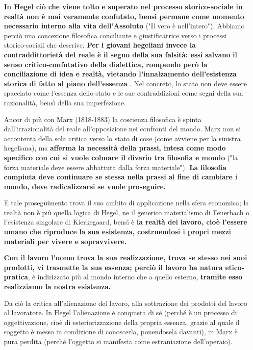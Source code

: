  \textbf{In Hegel ciò che viene tolto e superato nel processo storico-sociale in realtà non è mai veramente confutato, bensì permane come momento necessario interno alla vita dell'Assoluto} ("Il vero è nell'intero"). Abbiamo perciò una concezione filosofica conciliante e giustificatrice verso i processi storico-sociali che descrive. \textbf{Per i giovani hegeliani invece la contraddittorietà del reale è il segno della sua falsità: essi salvano il senso critico-confutativo della dialettica, rompendo però la conciliazione di idea e realtà, vietando l'innalzamento dell'esistenza storica di fatto al piano dell'essenza }. Nel concreto, lo stato non deve essere spacciato come l'essenza dello stato e le sue contraddizioni come segni della sua razionalità, bensì della sua imperfezione.
 
 Ancor di più con Marx (1818-1883) la coscienza filosofica è spinta dall'irrazionalità del reale all'opposizione nei confronti del mondo. Marx non si accontenta della sola critica verso lo stato di cose (come avviene per la sinistra hegeliana), ma \textbf{afferma la necessità della prassi, intesa come modo specifico con cui si vuole colmare il divario tra filosofia e mondo} ("la forza materiale deve essere abbattuta dalla forza materiale"). \textbf{La filosofia compiuta deve continuare se stessa nella prassi al fine di cambiare i mondo, deve radicalizzarsi se vuole proseguire.}
 
 E tale proseguimento trova il suo ambito di applicazione nella sfera economica; la realtà non è più quella logica di Hegel, ne il generico materialismo di Feuerbach o l'esistenza singolare di Kierkegaard, bensì è \textbf{la realtà del lavoro, cioè l'essere umano che riproduce la sua esistenza, costruendosi i propri mezzi materiali per vivere e sopravvivere.}
 
 \textbf{Con il lavoro l'uomo trova la sua realizzazione, trova se stesso nei suoi prodotti, vi trasmette la sua essenza; perciò il lavoro ha natura etico-pratica}, è indirizzato più al mondo interno che a quello esterno, \textbf{tramite esso realizziamo la nostra esistenza.}
 
 Da ciò la critica all'alienazione del lavoro, alla sottrazione dei prodotti del lavoro al lavoratore. In Hegel l'alienazione è conquista di sé (perché è un processo di oggettivazione, cioè di esteriorizzazione della propria essenza, grazie al quale il soggetto è messo in condizione di conoscerla, ponendosela davanti), in Marx è pura perdita (perché l'oggetto si manifesta come estraniazione dell'operaio).
 
